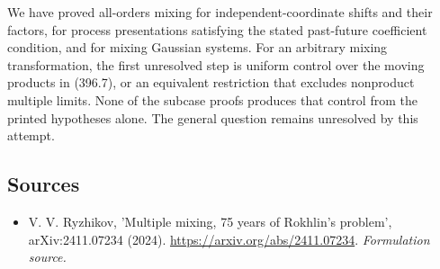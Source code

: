\documentclass[11pt]{article}
\begin{document}
We have proved all-orders mixing for independent-coordinate shifts
and their factors, for process presentations satisfying the stated
past-future coefficient condition, and for mixing Gaussian systems.
For an arbitrary mixing transformation, the first unresolved step
is uniform control over the moving products in (396.7), or an
equivalent restriction that excludes nonproduct multiple limits.
None of the subcase proofs produces that control from the printed
hypotheses alone. The general question remains unresolved by this
attempt.
\subsection{Sources}
\begin{itemize}
\item[S1]V. V. Ryzhikov, 'Multiple mixing, 75 years of Rokhlin's problem', arXiv:2411.07234 (2024).
\url{https://arxiv.org/abs/2411.07234}.
\textit{Formulation source.}
\end{itemize}
\end{document}
